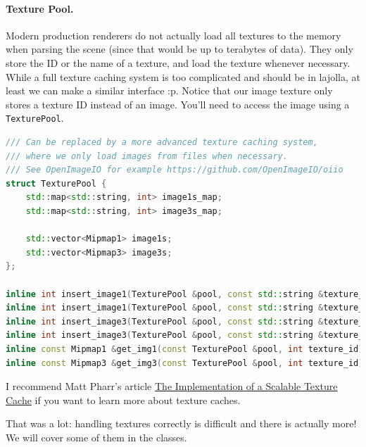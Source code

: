 \paragraph{Texture Pool.} Modern production renderers do not actually load all textures to the memory when parsing
the scene (since that would be up to terabytes of data). They only store the ID or the name of a texture, and load the texture whenever necessary. While a full texture caching system is too complicated and should be in lajolla, at least we can make a similar interface :p. Notice that our image texture only stores a texture ID instead of an image. You'll need to access the image using a \lstinline{TexturePool}.
\begin{lstlisting}[language=c++]
/// Can be replaced by a more advanced texture caching system,
/// where we only load images from files when necessary.
/// See OpenImageIO for example https://github.com/OpenImageIO/oiio
struct TexturePool {
    std::map<std::string, int> image1s_map;
    std::map<std::string, int> image3s_map;

    std::vector<Mipmap1> image1s;
    std::vector<Mipmap3> image3s;
};

inline int insert_image1(TexturePool &pool, const std::string &texture_name, const fs::path &filename);
inline int insert_image1(TexturePool &pool, const std::string &texture_name, const Image1 &img);
inline int insert_image3(TexturePool &pool, const std::string &texture_name, const fs::path &filename);
inline int insert_image3(TexturePool &pool, const std::string &texture_name, const Image3 &img);
inline const Mipmap1 &get_img1(const TexturePool &pool, int texture_id);
inline const Mipmap3 &get_img3(const TexturePool &pool, int texture_id);
\end{lstlisting}

I recommend Matt Pharr's article \href{https://www.pbrt.org/texcache.pdf}{The Implementation of a Scalable Texture Cache} if you want to learn more about texture caches.

That was a lot: handling textures correctly is difficult and there is actually more! We will cover some of them in the classes.

